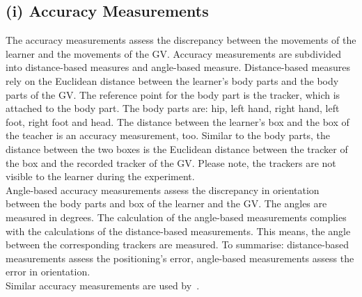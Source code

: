 \subsection{(i) Accuracy Measurements}
The accuracy measurements assess the discrepancy between the movements of the learner and the movements of the GV. Accuracy measurements are subdivided into distance-based measures and angle-based measure. Distance-based measures rely on the Euclidean distance between the learner's body parts and the body parts of the GV. The reference point for the body part is the tracker, which is attached to the body part. The body parts are: hip, left hand, right hand, left foot, right foot and head. The distance between the learner's box and the box of the teacher is an accuracy measurement, too. Similar to the body parts, the distance between the two boxes is the Euclidean distance between the tracker of the box and the recorded tracker of the GV. Please note, the trackers are not visible to the learner during the experiment.\\
Angle-based accuracy measurements assess the discrepancy in orientation between the body parts and box of the learner and the GV. The angles are measured in degrees. The calculation of the angle-based measurements complies with the calculations of the distance-based measurements. This means, the angle between the corresponding trackers are measured. To summarise: distance-based measurements assess the positioning's error, angle-based measurements assess the error in orientation.\\

Similar accuracy measurements are used by~\cite{onebody,thaichichua,YouMove,physioathome,vrdancetrainer,lightguide}.

